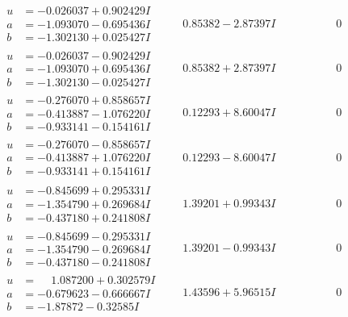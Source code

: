 \documentclass[1p]{elsarticle_modified}
\theoremstyle{definition}
\begin{document}
$$\begin{array}{c|c|c}
\begin{aligned}
u &= -0.026037 + 0.902429 I \\
a &= -1.093070 - 0.695436 I \\
b &= -1.302130 + 0.025427 I\end{aligned}
 & \phantom{-}0.85382 - 2.87397 I & \phantom{-0.000000 } 0 \\ \hline\begin{aligned}
u &= -0.026037 - 0.902429 I \\
a &= -1.093070 + 0.695436 I \\
b &= -1.302130 - 0.025427 I\end{aligned}
 & \phantom{-}0.85382 + 2.87397 I & \phantom{-0.000000 } 0 \\ \hline\begin{aligned}
u &= -0.276070 + 0.858657 I \\
a &= -0.413887 - 1.076220 I \\
b &= -0.933141 - 0.154161 I\end{aligned}
 & \phantom{-}0.12293 + 8.60047 I & \phantom{-0.000000 } 0 \\ \hline\begin{aligned}
u &= -0.276070 - 0.858657 I \\
a &= -0.413887 + 1.076220 I \\
b &= -0.933141 + 0.154161 I\end{aligned}
 & \phantom{-}0.12293 - 8.60047 I & \phantom{-0.000000 } 0 \\ \hline\begin{aligned}
u &= -0.845699 + 0.295331 I \\
a &= -1.354790 + 0.269684 I \\
b &= -0.437180 + 0.241808 I\end{aligned}
 & \phantom{-}1.39201 + 0.99343 I & \phantom{-0.000000 } 0 \\ \hline\begin{aligned}
u &= -0.845699 - 0.295331 I \\
a &= -1.354790 - 0.269684 I \\
b &= -0.437180 - 0.241808 I\end{aligned}
 & \phantom{-}1.39201 - 0.99343 I & \phantom{-0.000000 } 0 \\ \hline\begin{aligned}
u &= \phantom{-}1.087200 + 0.302579 I \\
a &= -0.679623 - 0.666667 I \\
b &= -1.87872 - 0.32585 I\end{aligned}
 & \phantom{-}1.43596 + 5.96515 I & \phantom{-0.000000 } 0 \\ \hline\begin{aligned}

\end{aligned}
\end{array}$$
\end{document}
